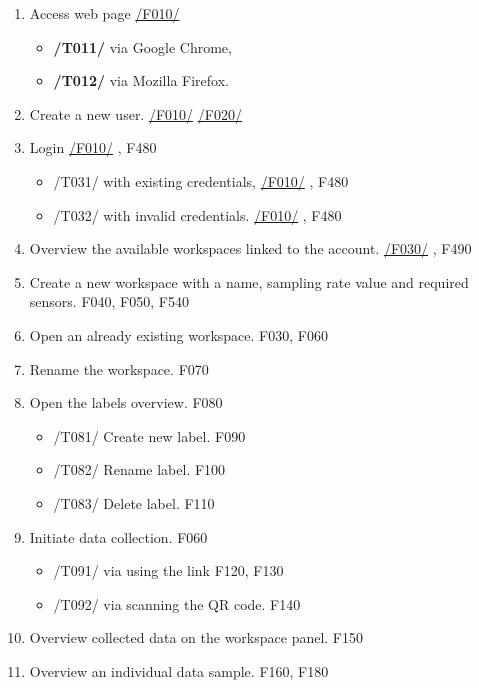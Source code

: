 \begin{enumerate}[{label = \textbf{/T{\protect\twodigits{\arabic{enumi}}}0/}, leftmargin = *}]
    \item Access web page \hyperref[welcome_page]{/F010/}
    \begin{itemize}
        \item \textbf{/T011/} via Google Chrome,
        \item \textbf{/T012/} via Mozilla Firefox.
    \end{itemize}
    \item Create a new user. \hyperref[welcome_page]{/F010/} \hyperref[registration_panel]{/F020/}
    \item Login \hyperref[welcome_page]{/F010/} , F480
    \begin{itemize}
        \item /T031/ with existing credentials, \hyperref[welcome_page]{/F010/} , F480
        \item /T032/ with invalid credentials. \hyperref[welcome_page]{/F010/} , F480
    \end{itemize}
    \item Overview the available workspaces linked to the account. \hyperref[workspaces_ov]{/F030/} , F490
    \item Create a new workspace with a name, sampling rate value and required sensors. F040, F050, F540
    \item Open an already existing workspace. F030, F060
    \item Rename the workspace. F070
    \item Open the labels overview. F080
    \begin{itemize}
        \item /T081/ Create new label. F090
        \item /T082/ Rename label. F100
        \item /T083/ Delete label. F110
    \end{itemize}
    \item Initiate data collection. F060
    \begin{itemize}
        \item /T091/ via using the link F120, F130
        \item /T092/ via scanning the QR code. F140
    \end{itemize}
    \item Overview collected data on the workspace panel. F150
    \item Overview an individual data sample. F160, F180

\end{enumerate}
